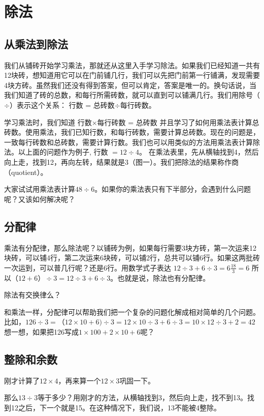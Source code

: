 \chapter{除法}
\section{从乘法到除法}

我们从铺砖开始学习乘法，那就还从这里入手学习除法。如果我们已经知道一共有12块砖，想知道用它可以在门前铺几行，我们可以先把门前第一行铺满，发现需要4块方砖。虽然我们还没有得到答案，但可以肯定，答案是唯一的。换句话说，当我们知道了砖的总数，和每行所需砖数，就可以直到可以铺满几行。我们用除号（$\div$）表示这个关系： 行数 = 总砖数$\div$每行砖数。

学习乘法时，我们知道
行数$\times$每行砖数 = 总砖数 并且学习了如何用乘法表计算总砖数。使用乘法，我们已知行数，和每行砖数，需要计算总砖数。现在的问题是，一致每行砖数和总砖数，需要计算行数。我们也可以用类似的方法用乘法表计算除法。以上面的问题作为例子, 行数 $= 12\div4$。 在乘法表里，先从横轴找到4，然后向上走，找到12，再向左转，结果就是3（图一）。我们把除法的结果称作商（quotient）。

大家试试用乘法表计算$48\div6$。如果你的乘法表只有下半部分，会遇到什么问题呢？又该如何解决呢？

\section{分配律}

乘法有分配律，那么除法呢？以铺砖为例，如果每行需要3块方砖，第一次运来12块砖，可以铺4行，第二次运来6块砖，可以铺2行，总共可以铺6行。如果这两批砖一次运到，可以普几行呢？还是6行。用数学式子表达 $12\div3 + 6\div3 = 6\frac{18}{3} = 6$ 所以$（12+6）\div 3 = 12\div3 + 6\div3$。也就是说，除法也有分配律。

除法有交换律么？

和乘法一样，分配律可以帮助我们把一个复杂的问题化解成相对简单的几个问题。 比如，$126\div3 = （12\times10+6)\div3 = 12\times10\div3 + 6\div3 = 10\times12\div3 + 2 = 42$ 想一想，如果把126写成$1\times100+2\times10+6$呢？


\section{整除和余数}

刚才计算了$12\times4$，再来算一个$12\times3$巩固一下。

那么$13\div3$等于多少？用刚才的方法，从横轴找到3，然后向上走，找不到13。找到12之后，下一个就是15。在这种情况下，我们说，13不能被4整除。

